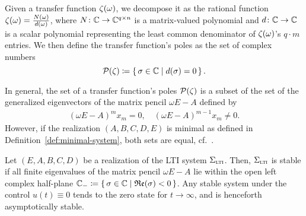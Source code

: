 \begin{definition}\label{def:transfer-function-poles}
    Given a transfer function $\zeta(\omega)$, we decompose it as the rational function $\zeta(\omega) = \frac{N(\omega)}{d(\omega)}$, where $N \colon \mathbb{C} \to \mathbb{C}^{q \times n}$ is a matrix-valued polynomial and $d \colon \mathbb{C} \to \mathbb{C}$ is a scalar polynomial representing the least common denominator of $\zeta(\omega)$'s $q \cdot m$ entries.
    We then define the transfer function's poles as the set of complex numbers
    \begin{equation*}
        \mathcal{P}(\zeta) \coloneqq \left\{\,\sigma \in \mathbb{C}\mid d(\sigma) = 0\,\right\}.
    \end{equation*}
\end{definition}

\begin{remark}
    In general, the set of a transfer function's poles $\mathcal{P}(\zeta)$ is a subset of the set of the generalized eigenvectors of the matrix pencil $\omega E - A$ defined by
    \begin{align*}
        {(\omega E - A)}^m x_m = 0,\quad {(\omega E - A)}^{m - 1} x_m \neq 0.
    \end{align*}
    However, if the realization $(A, B, C, D, E)$ is minimal as defined in Definition~\ref{def:minimal-system}, both sets are equal, cf.~\cite[Section~2]{Benner2017}.
\end{remark}

\begin{definition}\label{def:lti-stability}
    Let $(E, A, B, C, D)$ be a realization of the \ac{LTI} system $\Sigma_{\textnormal{\scshape lti}}$.
    Then, $\Sigma_{\textnormal{\scshape lti}}$ is stable if all finite eigenvalues of the matrix pencil $\omega E - A$ lie within the open left complex half-plane $\mathbb{C}_{-} \coloneqq \left\{\,\sigma \in \mathbb{C}\mid\mathfrak{Re}(\sigma) < 0\,\right\}$.
    Any stable system under the control $u(t) \equiv 0$ tends to the zero state for $t \to \infty$, and is henceforth asymptotically stable.
\end{definition}
